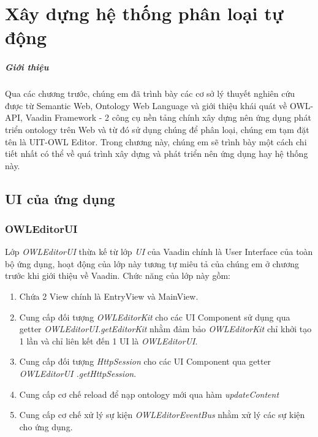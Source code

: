 \chapter{Xây dựng hệ thống phân loại tự động}
\paragraph{Giới thiệu} Qua các chương trước, chúng em đã trình bày các cơ sở lý thuyết nghiên cứu được từ Semantic Web, Ontology Web Language và giới thiệu khái quát về OWL-API, Vaadin Framework - 2 công cụ nền tảng chính xây dựng nên ứng dụng phát triển ontology trên Web và từ đó sử dụng chúng để phân loại, chúng em tạm đặt tên là UIT-OWL Editor. Trong chương này, chúng em sẽ trình bày một cách chi tiết nhất có thể về quá trình xây dựng và phát triển nên ứng dụng hay hệ thống này.
\section{UI của ứng dụng}

\subsection{OWLEditorUI}
Lớp \textit{OWLEditorUI} thừa kế từ lớp \textit{UI} của Vaadin chính là User Interface của toàn bộ ứng dụng, hoạt động của lớp này tương tự miêu tả của chúng em ở chương trước khi giới thiệu về Vaadin. Chức năng của lớp này gồm:
\begin{enumerate}
	\item Chứa 2 View chính là EntryView và MainView.
	\item Cung cấp đối tượng \textit{OWLEditorKit} cho các UI Component sử dụng qua getter \textit{OWLEditorUI.getEditorKit} nhằm đảm bảo \textit{OWLEditorKit} chỉ khởi tạo 1 lần và chỉ liên kết đến 1 UI là \textit{OWLEditorUI}.
	\item Cung cấp đối tượng \textit{HttpSession} cho các UI Component qua getter \textit{OWLEditorUI .getHttpSession}.
	\item Cung cấp cơ chế reload để nạp ontology mới qua hàm \textit{updateContent}
	\item Cung cấp cơ chế xử lý sự kiện \textit{OWLEditorEventBus} nhằm xử lý các sự kiện cho ứng dụng.
\end{enumerate}
%
